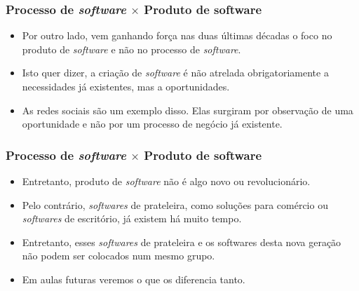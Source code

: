 \documentclass[11pt]{beamer}
\begin{document}
    \begin{frame}
      \frametitle{Processo de \textit{software} $\times$ Produto de software}
      \begin{itemize}
        \item Por outro lado, vem ganhando força nas duas últimas décadas o foco no produto de \textit{software} e não no processo de \textit{software}.
        \item Isto quer dizer, a criação de \textit{software} é não atrelada obrigatoriamente a necessidades já existentes, mas a oportunidades.
        \item As redes sociais são um exemplo disso. Elas surgiram por observação de uma oportunidade e não por um processo de negócio já existente.
      \end{itemize}
    \end{frame}

    \begin{frame}
      \frametitle{Processo de \textit{software} $\times$ Produto de software}
      \begin{itemize}
        \item Entretanto, produto de \textit{software} não é algo novo ou revolucionário.
        \item Pelo contrário, \textit{softwares} de prateleira, como soluções para comércio ou \textit{softwares} de escritório, já existem há muito tempo.
        \item Entretanto, esses \textit{softwares} de prateleira e os softwares desta nova geração não podem ser colocados num mesmo grupo.
        \item Em aulas futuras veremos o que os diferencia tanto.
      \end{itemize}
    \end{frame}
\end{document}
